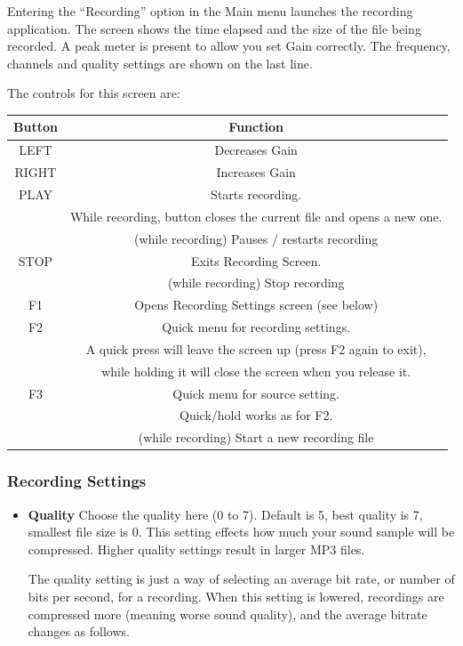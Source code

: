 Entering the ``Recording'' option in the Main menu launches the recording application. The screen shows the time elapsed and the size of the file being recorded. A peak meter is present to allow you set Gain correctly.  The frequency, channels and quality settings are shown on the last line.

The controls for this screen are:

\begin{table}[h!]
  \begin{center}
    \begin{tabular}{@{}cc@{}}\toprule
      \textbf{Button} & \textbf{Function} \\\midrule
      LEFT & Decreases Gain \\
      RIGHT & Increases Gain \\
      PLAY & Starts recording.  \\
           & While recording, button closes the current file and opens a new one.\\
           & (while recording) Pauses / restarts recording \\
      STOP & Exits Recording Screen.\\
           & (while recording) Stop recording \\
      F1 & Opens Recording Settings screen (see below) \\
      F2 & Quick menu for recording settings. \\
         & A quick press will leave the screen up (press F2 again to exit),\\
         & while holding it will close the screen when you release it. \\
      F3 & Quick menu for source setting. \\
         & Quick/hold works as for F2. \\
         & (while recording) Start a new recording file \\\bottomrule
    \end{tabular}
  \end{center}
\end{table}

\subsubsection{\label{ref:Recordingsettings}Recording Settings}
\begin{itemize}
\item \textbf{Quality}
  Choose the quality here (0 to 7). Default is 5, best quality is 7, smallest file size is 0.  This setting effects how much your sound sample will be compressed.  Higher quality settings result in larger MP3 files.

  The quality setting is just a way of selecting an average bit rate, or number of  bits per second, for a recording.  When  this setting is lowered, recordings are compressed more (meaning worse sound quality), and the average bitrate changes as follows.
\end{itemize}

